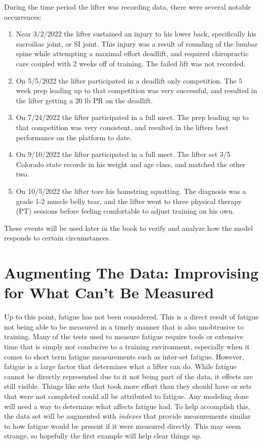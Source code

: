 During the time period the lifter was recording data, there were several notable occurrences:

\begin{enumerate}
    \item Near 3/2/2022 the lifter sustained an injury to his lower back, specifically his sacroiliac joint, or SI joint. This injury was a result of rounding of the lumbar spine while attempting a maximal effort deadlift, and required chiropractic care coupled with 2 weeks off of training. The failed lift was not recorded.
    
    \item On 5/5/2022 the lifter participated in a deadlift only competition. The 5 week prep leading up to that competition was very successful, and resulted in the lifter getting a 20 lb PR on the deadlift.
    
    \item On 7/24/2022 the lifter participated in a full meet. The prep leading up to that competition was very consistent, and resulted in the lifters best performance on the platform to date.
    
   	\item On 9/10/2022 the lifter participated in a full meet. The lifter set 3/5 Colorado state records in his weight and age class, and matched the other two.
    
    \item On 10/5/2022 the lifter tore his hamstring squatting. The diagnosis was a grade 1-2 muscle belly tear, and the lifter went to three physical therapy (PT) sessions before feeling comfortable to adjust training on his own.
\end{enumerate}

These events will be used later in the book to verify and analyze how the model responds to certain circumstances.


\section{Augmenting The Data: Improvising for What Can't Be Measured}
\label{sec:AugmentedDataSet}

Up to this point, fatigue has not been considered. This is a direct result of fatigue not being able to be measured in a timely manner that is also unobtrusive to training. Many of the tests used to measure fatigue require tools or extensive time that is simply not conducive to a training environment, especially when it comes to short term fatigue measurements such as inter-set fatigue. However, fatigue is a large factor that determines what a lifter can do. While fatigue cannot be directly represented due to it not being part of the data, it effects are still visible. Things like sets that took more effort than they should have or sets that were not completed could all be attributed to fatigue. Any modeling done will need a way to determine what affects fatigue had. To help accomplish this, the data set will be augmented with \textit{indexes} that provide measurements similar to how fatigue would be present if it were measured directly. This may seem strange, so hopefully the first example will help clear things up.

